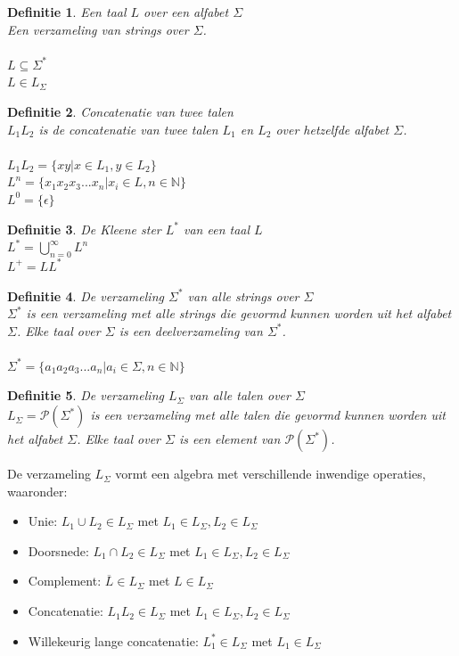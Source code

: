 \documentclass[a4paper]{article}
\newtheorem{tdefinitie}{Definitie}[section]
\newenvironment{definitie}[1]%
  {\begin{mdframed}[backgroundcolor=silver,
    topline=false,
    rightline=false,
    leftline=false,
    bottomline=false]\begin{tdefinitie}#1\\\normalfont}%
  {\end{tdefinitie}\end{mdframed}}
\newcommand{\powerset}{\ensuremath{\mathcal{P}}}
\newcommand{\nat}{\ensuremath{\mathbb{N}}}
\newcommand{\sstar}{\ensuremath{\Sigma^*}}
\begin{document}
\begin{definitie}{Een taal $L$ over een alfabet $\Sigma$}
  Een verzameling van strings over $\Sigma$.\\
  \\ $L \subseteq \sstar$
  \\ $L \in L_\Sigma$
\end{definitie}

\begin{definitie}{Concatenatie van twee talen}
  $L_1L_2$ is de concatenatie van twee talen $L_1$ en $L_2$ over hetzelfde alfabet $\Sigma$. \\
  \\ $L_1L_2 = \{xy|x \in L_1, y \in L_2\}$
  \\ $L^n = \{x_1x_2x_3...x_n|x_i \in L, n \in \nat\}$
  \\ $L^0 = \{\epsilon\}$
\end{definitie}

\begin{definitie}{De Kleene ster $L^*$ van een taal $L$}
  $L^* = \bigcup^\infty_{n=0}L^n$
  \\ $L^+ = LL^*$
\end{definitie}

\begin{definitie}{De verzameling $\sstar$ van alle strings over $\Sigma$}
  $\sstar$ is een verzameling met alle strings die gevormd kunnen worden uit het alfabet $\Sigma$. Elke taal over $\Sigma$ is een deelverzameling van $\sstar$. \\
  \\ $\sstar = \{a_1a_2a_3...a_n|a_i \in \Sigma, n \in \nat\}$
\end{definitie}

\begin{definitie}{De verzameling $L_\Sigma$ van alle talen over $\Sigma$}
  $L_\Sigma = \powerset(\sstar)$ is een verzameling met alle talen die gevormd kunnen worden uit het alfabet $\Sigma$. Elke taal over $\Sigma$ is een element van $\powerset(\sstar)$.
\end{definitie}

De verzameling $L_\Sigma$ vormt een algebra met verschillende inwendige operaties, waaronder:
\begin{itemize}
\item Unie: $L_1 \cup L_2 \in L_\Sigma$ met $L_1 \in L_\Sigma, L_2 \in L_\Sigma$
\item Doorsnede: $L_1 \cap L_2 \in L_\Sigma$ met $L_1 \in L_\Sigma, L_2 \in L_\Sigma$
\item Complement: $\overline{L} \in L_\Sigma$ met $L \in L_\Sigma$
\item Concatenatie: $L_1L_2 \in L_\Sigma$ met $L_1 \in L_\Sigma, L_2 \in L_\Sigma$
\item Willekeurig lange concatenatie: $L_1^* \in L_\Sigma$ met $L_1 \in L_\Sigma$
\end{itemize}
\end{document}
